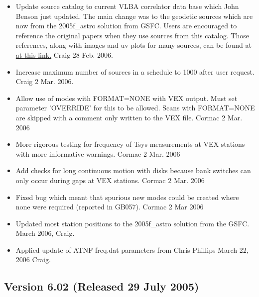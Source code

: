 \documentclass{report}
\begin{document}
\begin{itemize}
\item Update source catalog to current VLBA correlator data base which
John Benson just updated.  The main change was to the geodetic sources
which are now from the 2005f\_astro solution from GSFC.  Users
are encouraged to reference the original papers when they use sources
from this catalog.  Those references, along with images and uv plots
for many sources, can be found at 
{\href{http://vlbi.gsfc.nasa.gov/solutions/2005f\_astro/2005f\_astro\_cat.html}{at this link.}}
Craig  28 Feb. 2006.

\item Increase maximum number of sources in a schedule to 1000 after
user request.  Craig  2 Mar. 2006.

\item Allow use of modes with FORMAT=NONE with VEX output. Must set parameter
'OVERRIDE' for this to be allowed. Scans with FORMAT=NONE are skipped with a
comment only written to the VEX file.  Cormac 2 Mar. 2006

\item More rigorous testing for frequency of Tsys measurements at VEX
stations with more informative warnings.  Cormac 2 Mar. 2006

\item Add checks for long continuous motion with disks because bank
switches can only occur during gaps at VEX stations.  Cormac  2 Mar. 2006

\item Fixed bug which meant that spurious new modes could be created
where none were required (reported in GB057).  Cormac  2 Mar 2006

\item Updated most station positions to the 2005f\_astro
solution from the GSFC.  March 2006, Craig.

\item Applied update of ATNF freq.dat parameters from Chris Phillips
March 22, 2006 Craig.


\end{itemize}

\subsection{\label{SSEC:VER_6.02}Version 6.02 (Released 29 July 2005)}
\end{document}
